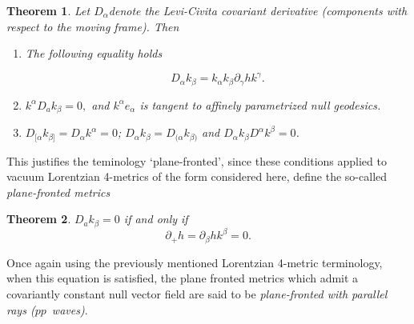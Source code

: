 \documentclass[12pt,a4paper]{article}
\newcounter{theorem}
\newtheorem{theorem}{Theorem}[section]   %
\newcounter{eg}
\def\p{\partial}
\begin{document}
\begin{theorem}
  
Let $D_\alpha$denote the Levi-Civita covariant derivative
(components with respect to the moving frame). Then

\begin{enumerate}

\item The following equality holds

\begin{equation}
D_\alpha k_{\beta}=k_{\alpha}k_{\beta}\p_{\gamma} h k^{\gamma}.
\end{equation}

\item $k^{\alpha}D_{a}k_{\beta}=0,$ and $k^{\alpha}e_{\alpha}$ is
  tangent to affinely parametrized null geodesics.

\item $D_{[\alpha}k_{\beta]} = D_{\alpha}k^{\alpha}=0$; \quad 
$D_{\alpha}k_{\beta} = D_{(\alpha}k_{\beta)}$ \quad \hbox{and} \quad 
$D_{\alpha}k_{\beta} D_{}^{\alpha}k^{\beta} = 0$. 

\end{enumerate}
\end{theorem}

This justifies the teminology `plane-fronted', since these conditions
applied to vacuum Lorentzian 4-metrics of the form considered here,
define the so-called {\em plane-fronted metrics}

\begin{theorem}

$D_{a}k_{\beta}=0$ if and only if
\begin{equation}
\p_+ h = \p_\beta h k^{\beta}=0.
\end{equation}

\end{theorem}

Once again using the previously mentioned Lorentzian 4-metric
terminology, when this equation is satisfied, the plane fronted
metrics which admit a covariantly constant null vector
field are said to be {\em plane-fronted with parallel rays
($pp$~waves)}.
\end{document}
